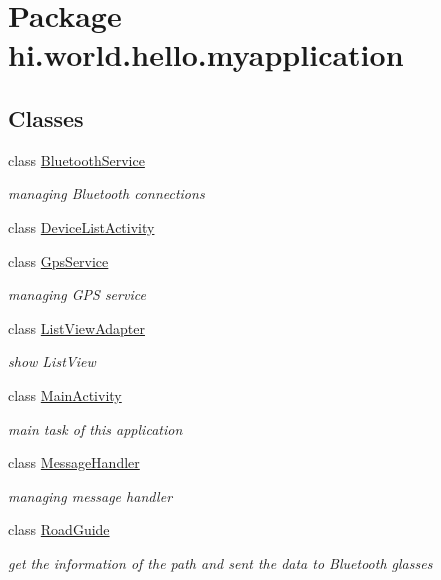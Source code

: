 \hypertarget{namespacehi_1_1world_1_1hello_1_1myapplication}{}\section{Package hi.\+world.\+hello.\+myapplication}
\label{namespacehi_1_1world_1_1hello_1_1myapplication}
\subsection*{Classes}
\begin{DoxyCompactItemize}
\item 
class \mbox{\hyperlink{classhi_1_1world_1_1hello_1_1myapplication_1_1_bluetooth_service}{Bluetooth\+Service}}
\begin{DoxyCompactList}\small\item\em managing Bluetooth connections \end{DoxyCompactList}\item 
class \mbox{\hyperlink{classhi_1_1world_1_1hello_1_1myapplication_1_1_device_list_activity}{Device\+List\+Activity}}
\item 
class \mbox{\hyperlink{classhi_1_1world_1_1hello_1_1myapplication_1_1_gps_service}{Gps\+Service}}
\begin{DoxyCompactList}\small\item\em managing G\+PS service \end{DoxyCompactList}\item 
class \mbox{\hyperlink{classhi_1_1world_1_1hello_1_1myapplication_1_1_list_view_adapter}{List\+View\+Adapter}}
\begin{DoxyCompactList}\small\item\em show List\+View \end{DoxyCompactList}\item 
class \mbox{\hyperlink{classhi_1_1world_1_1hello_1_1myapplication_1_1_main_activity}{Main\+Activity}}
\begin{DoxyCompactList}\small\item\em main task of this application \end{DoxyCompactList}\item 
class \mbox{\hyperlink{classhi_1_1world_1_1hello_1_1myapplication_1_1_message_handler}{Message\+Handler}}
\begin{DoxyCompactList}\small\item\em managing message handler \end{DoxyCompactList}\item 
class \mbox{\hyperlink{classhi_1_1world_1_1hello_1_1myapplication_1_1_road_guide}{Road\+Guide}}
\begin{DoxyCompactList}\small\item\em get the information of the path and sent the data to Bluetooth glasses \end{DoxyCompactList}\end{DoxyCompactItemize}
